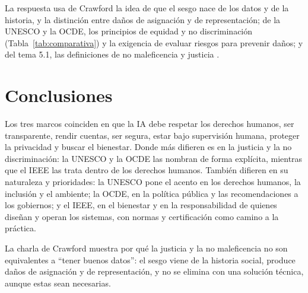 \documentclass[11pt,letterpaper]{article}
\begin{document}
La respuesta usa de Crawford la idea de que el sesgo nace de los datos y de la historia, y la distinción entre daños de asignación y de representación; de la UNESCO y la OCDE, los principios de equidad y no discriminación (Tabla~\ref{tab:comparativa}) y la exigencia de evaluar riesgos para prevenir daños; y del tema 5.1, las definiciones de no maleficencia y justicia \parencite{iae_u5_t51}.

\section{Conclusiones}

Los tres marcos coinciden en que la IA debe respetar los derechos humanos, ser transparente, rendir cuentas, ser segura, estar bajo supervisión humana, proteger la privacidad y buscar el bienestar. Donde más difieren es en la justicia y la no discriminación: la UNESCO y la OCDE las nombran de forma explícita, mientras que el IEEE las trata dentro de los derechos humanos. También difieren en su naturaleza y prioridades: la UNESCO pone el acento en los derechos humanos, la inclusión y el ambiente; la OCDE, en la política pública y las recomendaciones a los gobiernos; y el IEEE, en el bienestar y en la responsabilidad de quienes diseñan y operan los sistemas, con normas y certificación como camino a la práctica.

La charla de Crawford muestra por qué la justicia y la no maleficencia no son equivalentes a ``tener buenos datos'': el sesgo viene de la historia social, produce daños de asignación y de representación, y no se elimina con una solución técnica, aunque estas sean necesarias.

\end{document}
